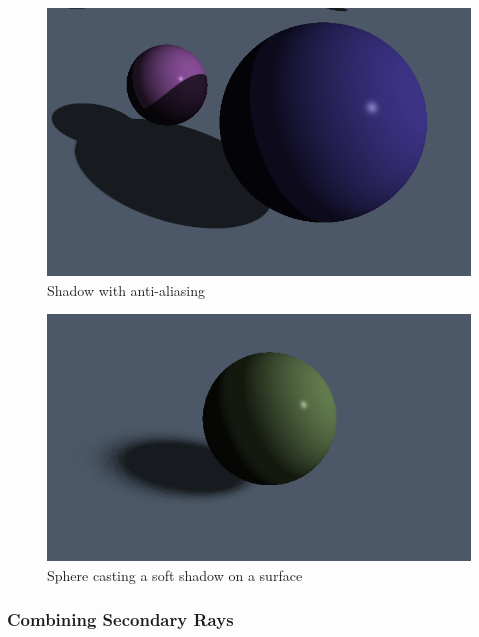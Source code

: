 \documentclass[final]{cmpreport}
\begin{document}
\begin{figure}
    \centering
    \includegraphics[width=\textwidth]{img/softish_shadow.png}
    \caption{Shadow with anti-aliasing}
    \label{softish_shadow}
\end{figure}

\begin{figure}
    \centering
    \includegraphics[width=\textwidth]{img/soft_shadow.png}
    \caption{Sphere casting a soft shadow on a surface}
    \label{soft_shadow}
\end{figure}

\subsubsection{Combining Secondary Rays}
\end{document}
